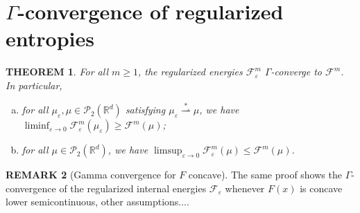 \documentclass[11pt,leqno]{amsart}
\newtheorem{thm}{THEOREM}[section]
\theoremstyle{definition}
\newtheorem{remark}[thm]{REMARK}
\newcommand{\kcomment}[1]{{\color{Aquamarine}#1}} %
\newcommand{\Rd}{{\mathord{\mathbb R}^d}}
\newcommand{\wsto}{\stackrel{*}{\rightharpoonup}}
\newcommand{\F}{\mathcal{F}}
\def\P{{\mathcal P}}
\def\e{\varepsilon}
\def\F{\mathcal{F}}
\begin{document}
\section{$\Gamma$-convergence of regularized entropies}

\begin{thm} \label{Gamma convergence theorem2}
For all $m \geq 1$, the regularized energies $\F^m_\e$ $\Gamma$-converge to $\F^m$. In particular,
\begin{enumerate}[(a)]
\item for all $\mu_\e, \mu \in \P_2(\Rd)$ satisfying $\mu_\e \wsto \mu$, we have $\liminf_{\e \to 0 } \F^m_\e(\mu_\e) \geq \F^m(\mu)$; \label{liminf condition 2}
\item for all $\mu \in \P_2(\Rd)$, we have $\limsup_{\e \to 0} \F^m_\e(\mu) \leq \F^m(\mu)$. \label{limsup condition 2}
\end{enumerate}
\end{thm}

\begin{remark}[Gamma convergence for $F$ concave]
The same proof shows the $\Gamma$-convergence of the regularized internal energies $\F_\e$ whenever $F(x)$ is concave \kcomment{lower semicontinuous, other assumptions...}.
\end{remark}
\end{document}
